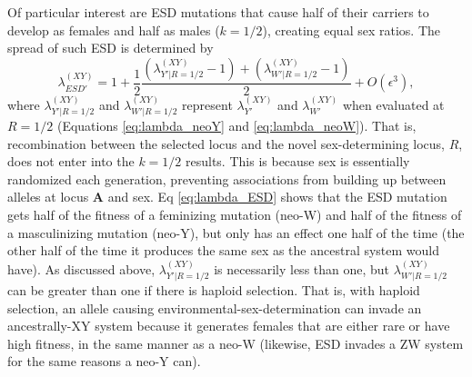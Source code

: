 \documentclass[10pt,letterpaper]{article}
\begin{document}
Of particular interest are ESD mutations that cause half of their carriers to develop as females and half as males ($k=1/2$), creating equal sex ratios.
The spread of such ESD is determined by
\begin{equation}
\lambda_{ESD'}^{(XY)} =1+ \frac{1}{2}\frac{(\lambda_{Y'\rvert R=1/2}^{(XY)}-1) + (\lambda_{W'\rvert R=1/2}^{(XY)}-1)}{2} + O\left(\epsilon^3\right),
\label{eq:lambda_ESD}
\end{equation}
\noindent
where $\lambda_{Y'\rvert R=1/2}^{(XY)}$ and $\lambda_{W'\rvert R=1/2}^{(XY)}$ represent $\lambda_{Y'}^{(XY)}$ and $\lambda_{W'}^{(XY)}$ when evaluated at $R=1/2$ (Equations \ref{eq:lambda_neoY} and \ref{eq:lambda_neoW}).
That is, recombination between the selected locus and the novel sex-determining locus, $R$, does not enter into the $k=1/2$ results.
This is because sex is essentially randomized each generation, %
preventing associations from building up between alleles at locus $\mathbf{A}$ and sex. 
Eq \eqref{eq:lambda_ESD} shows that the ESD mutation gets half of the fitness of a feminizing mutation (neo-W) and half of the fitness of a masculinizing mutation (neo-Y), but only has an effect one half of the time (the other half of the time it produces the same sex as the ancestral system would have). 
As discussed above, $\lambda_{Y'\rvert R=1/2}^{(XY)}$ is necessarily less than one, but $\lambda_{W'\rvert R=1/2}^{(XY)}$ can be greater than one if there is haploid selection.
That is, with haploid selection, an allele causing environmental-sex-determination can invade an ancestrally-XY system because it generates females that are either rare or have high fitness, in the same manner as a neo-W (likewise, ESD invades a ZW system for the same reasons a neo-Y can).
\end{document}
